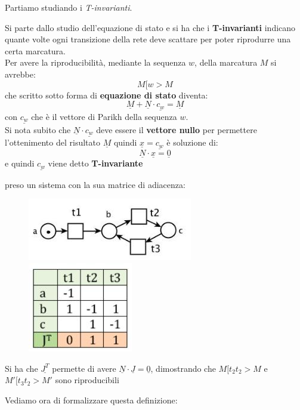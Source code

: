 \documentclass[a4paper,12pt, oneside]{book}
\begin{document}
Partiamo studiando i \textit{T-invarianti}.
\begin{definizione}
  Si parte dallo studio dell'equazione di stato e si ha che i
  \textbf{T-invarianti} indicano quante volte ogni transizione della rete deve
  scattare per poter riprodurre una certa marcatura.\\
  Per avere la riproducibilità, mediante la sequenza
  $w$, della marcatura $M$ si avrebbe:
  \[M[w>M\]
  che scritto sotto forma di \textbf{equazione di stato} diventa:
  \[\underline{M}+\underline{N}\cdot\underline{c_w}=\underline{M}\]
  con $\underline{c_w}$ che è il vettore di Parikh della sequenza $w$.\\
  Si nota subito che $\underline{N}\cdot\underline{c_w}$ deve essere il
  \textbf{vettore nullo} per permettere l'ottenimento del risultato
  $\underline{M}$ quindi $\underline{x}=\underline{c_w}$ è soluzione di:
  \[\underline{N}\cdot\underline{x}=\underline{0}\]
  e quindi $\underline{c_w}$ viene detto \textbf{T-invariante}
  \begin{esempio}
    preso un sistema con la sua matrice di adiacenza:
    \begin{figure}[H]
      \centering
      \includegraphics[scale = 0.6]{img/ti.jpg}
      \centering
      \includegraphics[scale = 0.5]{img/t2.jpg}
    \end{figure}
    Si ha che $\underline{J^T}$ permette di avere $\underline{N}\cdot
    \underline{J}=\underline{0}$, dimostrando che $M[t_2t_2>M$ e
    $M'[t_3t_2>M'$ sono riproducibili
  \end{esempio}
\end{definizione}
Vediamo ora di formalizzare questa definizione:
\end{document}
